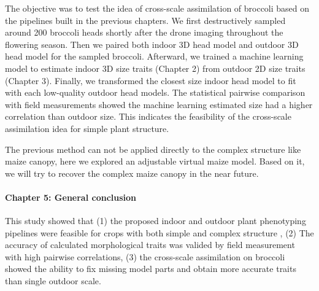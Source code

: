 \begin{eabstract}
  The objective was to test the idea of cross-scale assimilation of broccoli based on the pipelines built in the previous chapters. We first destructively sampled around 200 broccoli heads shortly after the drone imaging throughout the flowering season. Then we paired both indoor 3D head model and outdoor 3D head model for the sampled broccoli. Afterward, we trained a machine learning model to estimate indoor 3D size traits (Chapter 2) from outdoor 2D size traits (Chapter 3). Finally, we transformed the closest size indoor head model to fit with each low-quality outdoor head models. The statistical pairwise comparison with field measurements showed the machine learning estimated size had a higher correlation than outdoor size. This indicates the feasibility of the cross-scale assimilation idea for simple plant structure.

  The previous method can not be applied directly to the complex structure like maize canopy, here we explored an adjustable virtual maize model. Based on it, we will try to recover the complex maize canopy in the near future.
 

  \paragraph{Chapter 5: General conclusion}
  
  This study showed that (1) the proposed indoor and outdoor plant phenotyping pipelines were feasible for crops with both simple and complex structure  , (2) The accuracy of calculated morphological traits  was valided by field measurement with high pairwise correlations, (3) the cross-scale assimilation on broccoli showed the ability to fix missing model parts and obtain more accurate traits than single outdoor scale.
  
\end{eabstract}

